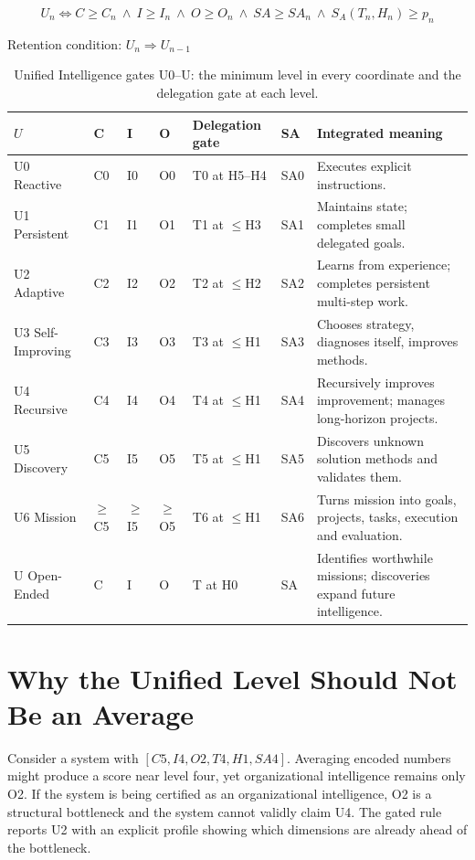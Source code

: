 \begin{equation}
U_n \iff C \ge C_n \ \wedge\ I \ge I_n \ \wedge\ O \ge O_n \ \wedge\ SA \ge SA_n \ \wedge\ S_A(T_n,H_n) \ge p_n
\end{equation}
\begin{center}Retention condition: $U_n \Rightarrow U_{n-1}$\end{center}

\begin{table}[!htbp]
\centering\small
\begin{tabularx}{\textwidth}{@{}llllllY@{}}
\toprule
$U$ & C & I & O & Delegation gate & SA & Integrated meaning \\
\midrule
U0 Reactive & C0 & I0 & O0 & T0 at H5--H4 & SA0 & Executes explicit instructions. \\
U1 Persistent & C1 & I1 & O1 & T1 at $\le$H3 & SA1 & Maintains state; completes small delegated goals. \\
U2 Adaptive & C2 & I2 & O2 & T2 at $\le$H2 & SA2 & Learns from experience; completes persistent multi-step work. \\
U3 Self-Improving & C3 & I3 & O3 & T3 at $\le$H1 & SA3 & Chooses strategy, diagnoses itself, improves methods. \\
U4 Recursive & C4 & I4 & O4 & T4 at $\le$H1 & SA4 & Recursively improves improvement; manages long-horizon projects. \\
U5 Discovery & C5 & I5 & O5 & T5 at $\le$H1 & SA5 & Discovers unknown solution methods and validates them. \\
U6 Mission & $\ge$C5 & $\ge$I5 & $\ge$O5 & T6 at $\le$H1 & SA6 & Turns mission into goals, projects, tasks, execution and evaluation. \\
U\Om{} Open-Ended & C\Om{} & I\Om{} & O\Om{} & T\Om{} at H0 & SA\Om{} & Identifies worthwhile missions; discoveries expand future intelligence. \\
\bottomrule
\end{tabularx}
\caption{Unified Intelligence gates U0--U\Om{}: the minimum level in every coordinate and the delegation gate at each level.}
\label{tab:ugates}
\end{table}

\section{Why the Unified Level Should Not Be an Average}

Consider a system with $[C5, I4, O2, T4, H1, SA4]$. Averaging encoded numbers might produce a score near level four, yet organizational intelligence remains only O2. If the system is being certified as an organizational intelligence, O2 is a structural bottleneck and the system cannot validly claim U4. The gated rule reports U2 with an explicit profile showing which dimensions are already ahead of the bottleneck.

